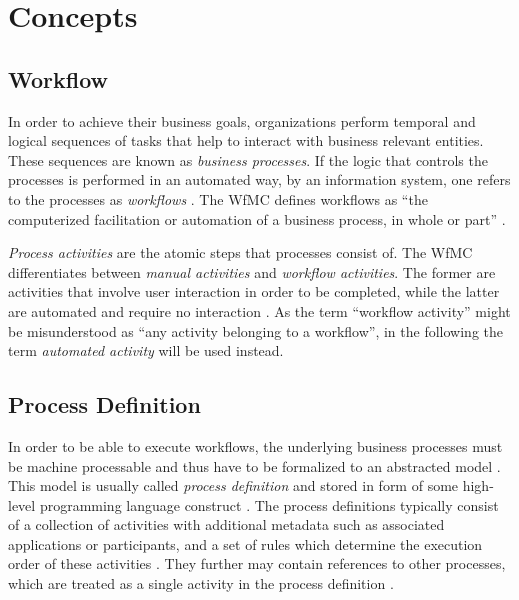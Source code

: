 
\section{Concepts} %
\label{sec:concepts}

  \subsection{Workflow} %
  \label{sub:workflow}
    In order to achieve their business goals, organizations perform temporal and logical sequences of tasks that help to interact with business relevant entities. These sequences are known as \emph{business processes}. If the logic that controls the processes is performed in an automated way, \eg by an information system, one refers to the processes as \emph{workflows} \cite{Becker1999Identifying,Hollingsworth1995WfMC}. The \ac{WfMC} defines workflows as ``the computerized facilitation or automation of a business process, in whole or part'' \cite{Hollingsworth1995WfMC}.

    \emph{Process activities} are the atomic steps that processes consist of. The \ac{WfMC} differentiates between \emph{manual activities} and \emph{workflow activities}. The former are activities that involve user interaction in order to be completed, while the latter are automated and require no interaction \cite{Hollingsworth1995WfMC}. As the term ``workflow activity'' might be misunderstood as ``any activity belonging to a workflow'', in the following the term \emph{automated activity} will be used instead.


  \subsection{Process Definition} %
  \label{sub:process_definition}
      In order to be able to execute workflows, the underlying business processes must be machine processable and thus have to be formalized to an abstracted model \cite{Hollingsworth1995WfMC}. This model is usually called \emph{process definition} and stored in form of some high-level programming language construct \cite{Hollingsworth1995WfMC,Wutke2008Model}.
      The process definitions typically consist of a collection of activities with additional metadata such as associated applications or participants, and a set of rules which determine the execution order of these activities \cite{Hollingsworth1995WfMC}. They further may contain references to other processes, which are treated as a single activity in the process definition \cite{Hollingsworth1995WfMC,Casati1999Specification}.

